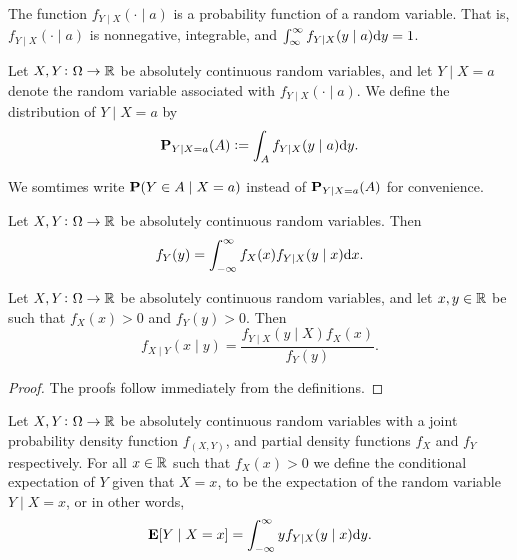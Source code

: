 \documentclass[11pt,a4paper]{article}
\begin{document}
\begin{proposition}
  The function $f_{Y \mid X}(\cdot \mid a)$ is a probability function
  of a random variable.
  That is, $f_{Y \mid X}(\cdot \mid a)$ is nonnegative,
  integrable, and $\int_{\infty}^{\infty} f_{Y \mid X}(y \mid a) \dy = 1$.
\end{proposition}

\begin{definition}
  Let $X,Y \colon \Omega \to \mathbb{R}$ be absolutely continuous random variables,
  and let $Y \mid X = a$ denote the random variable associated
  with $f_{Y \mid X}(\cdot \mid a)$.
  We define the distribution of $Y \mid X = a$ by
  \[
    \Prob_{Y \mid X = a}(A) :=
    \int_{A} f_{Y \mid X}(y \mid a) \dy.
  \]
\end{definition}
\begin{remark}
  We somtimes write $\mathbf{P}(Y \in A \mid X = a)$ instead of
  $\mathbf{P}_{Y \mid X = a}(A)$ for convenience.
\end{remark}

\begin{proposition}
  Let $X,Y \colon \Omega \to \mathbb{R}$ be absolutely continuous random variables.
  Then
  \[
    f_Y(y) =
    \int_{-\infty}^{\infty} f_X(x) f_{Y \mid X}(y \mid x) \dx.
  \]
\end{proposition}

\begin{proposition}
  Let $X,Y \colon \Omega \to \mathbb{R}$ be absolutely continuous random variables,
  and let $x,y \in \mathbb{R}$ be such that $f_X(x) > 0$ and $f_Y(y) > 0$.
  Then
  \[
    f_{X \mid Y}(x \mid y) =
    \frac{f_{Y \mid X}(y \mid X) f_X(x)}{f_Y(y)}.
  \]
\end{proposition}
\begin{proof}
  The proofs follow immediately from the definitions.
\end{proof}

\begin{definition}
  Let $X,Y \colon \Omega \to \mathbb{R}$ be absolutely continuous random variables with
  a joint probability density function $f_{(X,Y)}$,
  and partial density functions $f_X$ and $f_Y$ respectively.
  For all $x \in \mathbb{R}$ such that $f_X(x) > 0$ we define the conditional
  expectation of $Y$ given that $X = x$,
  to be the expectation of the random variable $Y \mid X = x$,
  or in other words,
  \[
    \E[Y \mid X = x] =
    \int_{-\infty}^{\infty} y f_{Y \mid X}(y \mid x) \dy.
  \]
\end{definition}
\end{document}
